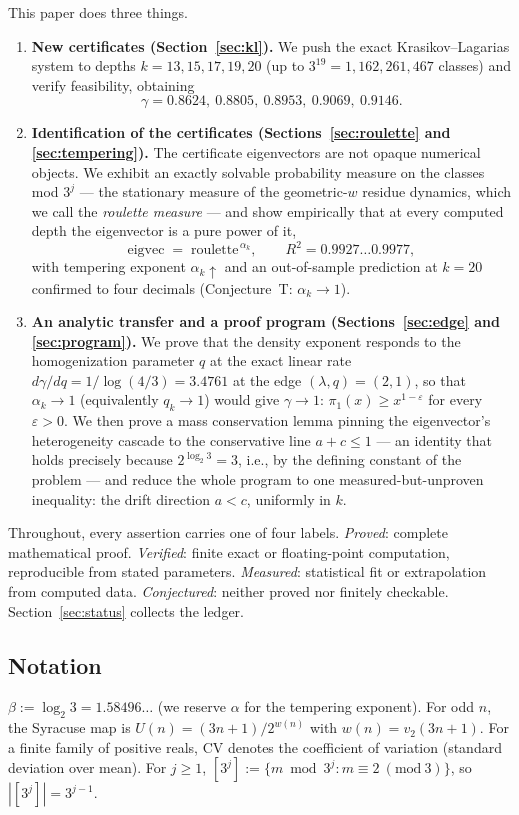 \documentclass[11pt]{article}
\theoremstyle{definition}
\theoremstyle{remark}
\newcommand{\CV}{\mathrm{CV}}
\newcommand{\lam}{\lambda}
\newcommand{\gam}{\gamma}
\newcommand{\bet}{\beta}
\begin{document}
This paper does three things.

\begin{enumerate}
\item \textbf{New certificates (Section~\ref{sec:kl}).} We push the exact
Krasikov--Lagarias system to depths $k = 13, 15, 17, 19, 20$ (up to
$3^{19} = 1{,}162{,}261{,}467$ classes) and verify feasibility, obtaining
\[
\gam = 0.8624,\ 0.8805,\ 0.8953,\ 0.9069,\ 0.9146 .
\]
\item \textbf{Identification of the certificates (Sections~\ref{sec:roulette}
and \ref{sec:tempering}).} The certificate eigenvectors are not opaque numerical
objects. We exhibit an exactly solvable probability measure on the classes mod
$3^j$ --- the stationary measure of the geometric-$w$ residue dynamics, which we
call the \emph{roulette measure} --- and show empirically that at every computed
depth the eigenvector is a pure power of it,
\[
\text{eigvec} \;=\; \text{roulette}^{\,\alpha_k},
\qquad R^2 = 0.9927 \ldots 0.9977,
\]
with tempering exponent $\alpha_k \uparrow$ and an out-of-sample prediction at
$k = 20$ confirmed to four decimals (Conjecture~T: $\alpha_k \to 1$).
\item \textbf{An analytic transfer and a proof program (Sections~\ref{sec:edge}
and \ref{sec:program}).} We prove that the density exponent responds to the
homogenization parameter $q$ at the exact linear rate
$d\gam/dq = 1/\log(4/3) = 3.4761$ at the edge $(\lam, q) = (2,1)$, so that
$\alpha_k \to 1$ (equivalently $q_k \to 1$) would give $\gam \to 1$:
$\pi_1(x) \geq x^{1-\varepsilon}$ for every $\varepsilon > 0$. We then prove a
mass conservation lemma pinning the eigenvector's heterogeneity cascade to the
conservative line $a + c \leq 1$ --- an identity that holds precisely because
$2^{\log_2 3} = 3$, i.e., by the defining constant of the problem --- and reduce
the whole program to one measured-but-unproven inequality: the drift direction
$a < c$, uniformly in $k$.
\end{enumerate}

Throughout, every assertion carries one of four labels. \emph{Proved}: complete
mathematical proof. \emph{Verified}: finite exact or floating-point computation,
reproducible from stated parameters. \emph{Measured}: statistical fit or
extrapolation from computed data. \emph{Conjectured}: neither proved nor
finitely checkable. Section~\ref{sec:status} collects the ledger.

\subsection*{Notation}
$\bet := \log_2 3 = 1.58496\ldots$ (we reserve $\alpha$ for the tempering
exponent). For odd $n$, the Syracuse map is $U(n) = (3n+1)/2^{w(n)}$ with
$w(n) = v_2(3n+1)$. For a finite family of positive reals, $\CV$ denotes the
coefficient of variation (standard deviation over mean). For $j \geq 1$,
$[3^j] := \{ m \bmod 3^j : m \equiv 2 \ (\mathrm{mod}\ 3) \}$, so
$|[3^j]| = 3^{j-1}$.
\end{document}
